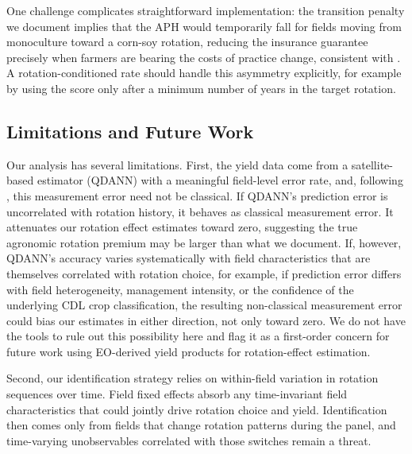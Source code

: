 \documentclass[12pt,letterpaper]{article}
\theoremstyle{remark}
\theoremstyle{remark}
\theoremstyle{plain}
\theoremstyle{definition}
\begin{document}
One challenge complicates straightforward implementation: the transition penalty we document implies that the APH would temporarily fall for fields moving from monoculture toward a corn-soy rotation, reducing the insurance guarantee precisely when farmers are bearing the costs of practice change, consistent with \citet{Connor2022}. A rotation-conditioned rate should handle this asymmetry explicitly, for example by using the score only after a minimum number of years in the target rotation.

\subsection{\label{subsec:limitations}Limitations and Future Work}

Our analysis has several limitations. First, the yield data come from a satellite-based estimator (QDANN) with a meaningful field-level error rate, and, following \citet{Benami2026}, this measurement error need not be classical. If QDANN's prediction error is uncorrelated with rotation history, it behaves as classical measurement error. It attenuates our rotation effect estimates toward zero, suggesting the true agronomic rotation premium may be larger than what we document. If, however, QDANN's accuracy varies systematically with field characteristics that are themselves correlated with rotation choice, for example, if prediction error differs with field heterogeneity, management intensity, or the confidence of the underlying CDL crop classification, the resulting non-classical measurement error could bias our estimates in either direction, not only toward zero. We do not have the tools to rule out this possibility here and flag it as a first-order concern for future work using EO-derived yield products for rotation-effect estimation.

Second, our identification strategy relies on within-field variation in rotation sequences over time. Field fixed effects absorb any time-invariant field characteristics that could jointly drive rotation choice and yield. Identification then comes only from fields that change rotation patterns during the panel, and time-varying unobservables correlated with those switches remain a threat.
\end{document}
